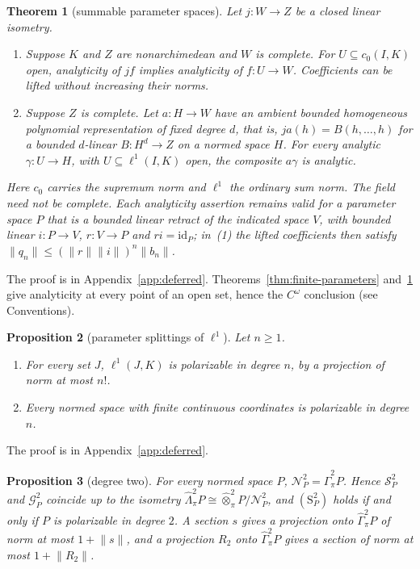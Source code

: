 \documentclass[11pt]{amsart}
\newtheorem{theorem}{Theorem}[section]
\newtheorem{proposition}[theorem]{Proposition}
\theoremstyle{definition}
\theoremstyle{remark}
\numberwithin{equation}{section}
\newcommand{\id}{\mathrm{id}}
\newcommand{\norm}[1]{\lVert #1\rVert}
\theoremstyle{plain}
\theoremstyle{definition}
\theoremstyle{plain}
\newcommand{\cN}{\mathcal N}
\newcommand{\cS}{\mathcal S}
\newcommand{\cG}{\mathcal G}
\begin{document}
\begin{theorem}[summable parameter spaces]\label{thm:summable-parameters}
Let $j\colon W\to Z$ be a closed linear isometry.
\begin{enumerate}
\item Suppose $K$ and $Z$ are nonarchimedean and $W$ is complete. For $U\subseteq c_0(I,K)$ open, analyticity of $jf$ implies analyticity of $f\colon U\to W$. Coefficients can be lifted without increasing their norms.
\item Suppose $Z$ is complete. Let $a\colon H\to W$ have an ambient bounded homogeneous polynomial representation of fixed degree $d$, that is, $ja(h)=B(h,\ldots,h)$ for a bounded $d$-linear $B\colon H^d\to Z$ on a normed space $H$. For every analytic $\gamma\colon U\to H$, with $U\subseteq\ell^1(I,K)$ open, the composite $a\gamma$ is analytic.
\end{enumerate}
Here $c_0$ carries the supremum norm and $\ell^1$ the ordinary sum norm. The field need not be complete. Each analyticity assertion remains valid for a parameter space $P$ that is a bounded linear retract of the indicated space $V$, with bounded linear $i\colon P\to V$, $r\colon V\to P$ and $ri=\id_P$; in~(1) the lifted coefficients then satisfy $\norm{q_n}\le(\norm r\norm i)^n\norm{b_n}$.
\end{theorem}
The proof is in Appendix~\ref{app:deferred}. Theorems~\ref{thm:finite-parameters} and~\ref{thm:summable-parameters} give
analyticity at every point of an open set, hence the $C^\omega$ conclusion (see Conventions).

\begin{proposition}[parameter splittings of $\ell^1$]\label{spl:prop:gamma-l1}
Let $n\ge1$.
\begin{enumerate}
\item For every set $J$, $\ell^1(J,K)$ is polarizable in degree $n$, by a projection of norm at most $n!$.
\item Every normed space with finite continuous coordinates is polarizable in degree $n$.
\end{enumerate}
\end{proposition}

The proof is in Appendix~\ref{app:deferred}.

\begin{proposition}[degree two]\label{spl:prop:degree-two}
For every normed space $P$, $\cN^2_P=\widehat\Gamma^2_\pi P$. Hence $\cS^2_P$ and $\cG^2_P$ coincide up to the isometry
$\widehat\Lambda^2_\pi P\cong\widehat\otimes^2_\pi P/\cN^2_P$, and $(\mathrm S^2_P)$ holds if and only if $P$ is
polarizable in degree $2$. A section $s$ gives a projection onto $\widehat\Gamma^2_\pi P$ of norm at most $1+\norm s$, and
a projection $R_2$ onto $\widehat\Gamma^2_\pi P$ gives a section of norm at most $1+\norm{R_2}$.
\end{proposition}
\end{document}
